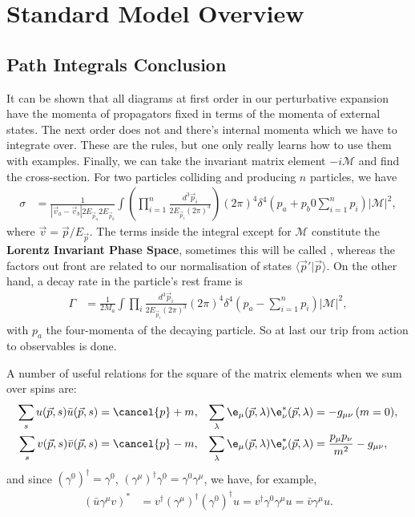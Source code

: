 \documentclass[a4paper, 11pt, normalem]{report}
\begin{document}
\chapter{Standard Model Overview}
\section{Path Integrals Conclusion}
It can be shown that all diagrams at first order in our perturbative expansion have the momenta of propagators fixed in terms of the momenta of external states.
The next order does not and there's internal momenta which we have to integrate over.
These are the rules, but one only really learns how to use them with examples.
Finally, we can take the invariant matrix element $-i\mathcal{M}$ and find the cross-section.
For two particles colliding and producing $n$ particles, we have
\begin{align}
    \sigma &= \frac{1}{|\vec{v}_a-\vec{v}_b|2E_{\vec{p}_a}2E_{\vec{p}_b}} \int \left(\prod_{i=1}^n\frac{d^3\vec{p}_i}{2E_{\vec{p}_i}(2\pi)^3}\right)(2\pi)^4\delta^4\left(p_a+p_b0\sum_{i=1}^np_i\right)|\mathcal{M}|^2,
\end{align}
where $\vec{v}=\vec{p}/E_{\vec{p}}$.
The terms inside the integral except for $\mathcal{M}$ constitute the \textbf{Lorentz Invariant Phase Space}, sometimes this will be called \lips, whereas the factors out front are related to our normalisation of states $\langle\vec{p}'|\vec{p}\rangle$.
On the other hand, a decay rate in the particle's rest frame is
\begin{align}
    \Gamma &= \frac{1}{2M_a}\int \prod_i \frac{d^3\vec{p}_i}{2E_{\vec{p}_i}(2\pi)^3}(2\pi)^4\delta^4\left(p_a-\sum_{i=1}^n p_i\right)|\mathcal{M}|^2,
\end{align}
with $p_a$ the four-momenta of the decaying particle.
So at last our trip from action to observables is done.

A number of useful relations for the square of the matrix elements when we sum over spins are:
\begin{align}
    \sum_s u(\vec{p},s)\bar{u}(\vec{p},s) &= \cancel{p}+m, & \sum_{\lambda}\e_\mu(\vec{p},\lambda)\e_\nu^*(\vec{p},\lambda)&=-g_{\mu\nu}\,(m=0), \\
    \sum_s v(\vec{p},s)\bar{v}(\vec{p},s) &= \cancel{p}-m, & \sum_\lambda \e_\mu(\vec{p},\lambda)\e_\nu^*(\vec{p},\lambda) &= \frac{p_\mu p_\nu}{m^2}-g_{\mu\nu},
\end{align}
and since $(\gamma^0)^\dagger = \gamma^0$, $(\gamma^\mu)^\dagger \gamma^0 = \gamma^0\gamma^\mu$, we have, for example,
\begin{align}
    (\bar{u}\gamma^\mu v)^* &= v^\dagger (\gamma^\mu)^\dagger(\gamma^0)^\dagger u = v^\dagger \gamma^0\gamma^\mu u = \bar{v}\gamma^\mu u.
\end{align}
\end{document}
